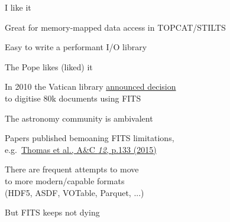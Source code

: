 \documentclass[20pt,landscape]{foils}
\newcommand{\bhref}[2]{\href{#1}{{\color{blue}#2}}}
\begin{document}
\begin{list1}
  \item I like it
  \begin{list2big}
    \item Great for memory-mapped data access in TOPCAT/STILTS
    \item Easy to write a performant I/O library
  \end{list2big}
  \item The Pope likes (liked) it
  \begin{list2big}
    \item In 2010 the Vatican library 
          \bhref{https://www.vaticanlibrary.va/en/the-collections/in-digitalizzation.html}
                {announced decision} \\
          to digitise 80k documents using FITS
  \end{list2big}
  \item The astronomy community is ambivalent
  \begin{list2big}
    \item Papers published bemoaning FITS limitations,
          \\ e.g.\
          \bhref{https://ui.adsabs.harvard.edu/abs/2015A&C....12..133T}
                {Thomas et al., A\&C {\sl 12}, p.133 (2015)}
    \item There are frequent attempts to move \\
          to more modern/capable formats \\
          (HDF5, ASDF, VOTable, Parquet, ...)
    \item But FITS keeps not dying
  \end{list2big}
\end{list1}

\end{document}
